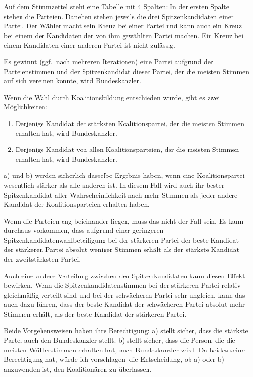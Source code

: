Auf dem Stimmzettel steht eine Tabelle mit 4 Spalten: In der ersten Spalte stehen die
Parteien. Daneben stehen jeweils die drei Spitzenkandidaten einer Partei. Der Wähler macht sein
Kreuz bei einer Partei und kann auch ein Kreuz bei einem der Kandidaten der von ihm gewählten
Partei machen. Ein Kreuz bei einem Kandidaten einer anderen Partei ist nicht zulässig.

Es gewinnt
(ggf.\ nach mehreren Iterationen) eine Partei aufgrund der Parteienstimmen und der Spitzenkandidat
dieser Partei, der die meisten Stimmen auf sich vereinen konnte, wird Bundeskanzler.

Wenn die Wahl durch Koalitionsbildung entschieden wurde, gibt es zwei Möglichkeiten:
\begin{enumerate}[label=\alph*)]
  \item Derjenige Kandidat der stärksten Koalitionspartei, der die meisten Stimmen erhalten hat, wird Bundeskanzler.
  \item Derjenige Kandidat von allen Koalitionsparteien, der die meisten Stimmen erhalten hat, wird Bundeskanzler.
\end{enumerate}

a) und b) werden sicherlich dasselbe Ergebnis haben, wenn eine Koalitionspartei wesentlich stärker als alle anderen ist.
In diesem Fall wird auch ihr bester Spitzenkandidat aller Wahrscheinlichkeit nach mehr Stimmen als jeder andere
Kandidat der Koalitionsparteien erhalten haben.

Wenn die Parteien eng beieinander liegen, muss das nicht der Fall sein.
Es kann durchaus vorkommen, dass aufgrund einer geringeren Spitzenkandidatenwahlbeteiligung bei der stärkeren Partei
der beste Kandidat der stärkeren Partei absolut weniger Stimmen erhält als der stärkste Kandidat der zweitstärksten
Partei.

Auch eine andere Verteilung zwischen den Spitzenkandidaten kann diesen Effekt bewirken. Wenn die Spitzenkandidatenstimmen
bei der stärkeren Partei relativ gleichmäßig verteilt sind und bei der schwächeren Partei sehr ungleich, kann das auch
dazu führen, dass der beste Kandidat der schwächeren Partei absolut mehr Stimmen erhält, als der beste Kandidat der
stärkeren Partei.

Beide Vorgehensweisen haben ihre Berechtigung: a) stellt sicher, dass die stärkste Partei auch den Bundeskanzler stellt.
b) stellt sicher, dass die Person, die die meisten Wählerstimmen erhalten hat, auch Bundeskanzler wird.
Da beides seine
Berechtigung hat, würde ich vorschlagen, die Entscheidung, ob a) oder b) anzuwenden ist, den Koalitionären zu überlassen.

